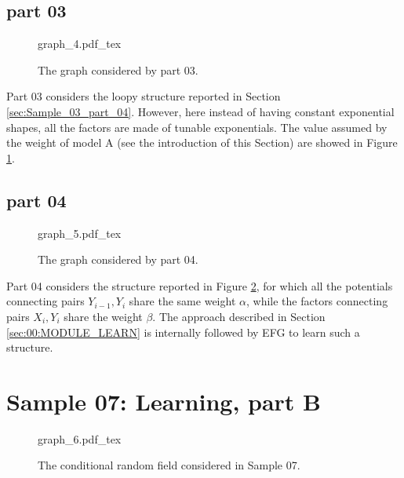 \subsection{part 03}

\begin{figure}
	\centering
\def\svgwidth{0.75 \textwidth}
{graph_4.pdf_tex} 
\caption{The graph considered by part 03.}
\label{fig:sample_06:2}
\end{figure}

Part 03 considers the loopy structure reported in Section \ref{sec:Sample_03_part_04}. However, here instead of having constant exponential shapes, all the factors are made of tunable exponentials. The value assumed by the weight of model A (see the introduction of this Section) are showed in Figure \ref{fig:sample_06:2}.

\subsection{part 04}

\begin{figure}
	\centering
\def\svgwidth{0.45 \textwidth}
{graph_5.pdf_tex} 
\caption{The graph considered by part 04.}
\label{fig:sample_06:3}
\end{figure}

Part 04 considers the structure reported in Figure \ref{fig:sample_06:3}, for which all the potentials connecting pairs $Y_{i-1}, Y_i$ share the same weight $\alpha$, while the factors connecting pairs $X_i,Y_i$ share the weight $\beta$. The approach described in Section \ref{sec:00:MODULE_LEARN} is internally followed by EFG to learn such a structure.

\section{Sample 07: Learning, part B}

\begin{figure}
	\centering
\def\svgwidth{0.6 \textwidth}
{graph_6.pdf_tex} 
\caption{The conditional random field considered in Sample 07.}
\label{fig:sample_07:0}
\end{figure}

